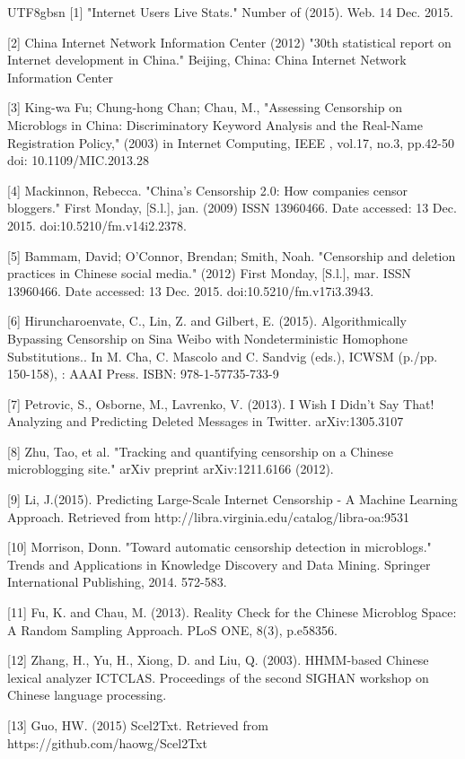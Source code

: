 \documentclass{article} %
\begin{document}
\begin{CJK*}{UTF8}{gbsn}
[1] "Internet Users Live Stats." Number of (2015). Web. 14 Dec. 2015.

[2] China Internet Network Information Center (2012) "30th statistical report on Internet development in China." Beijing, China: China Internet Network Information Center

[3] King-wa Fu; Chung-hong Chan; Chau, M., "Assessing Censorship on Microblogs in China: Discriminatory Keyword Analysis and the Real-Name Registration Policy," (2003) in Internet Computing, IEEE , vol.17, no.3, pp.42-50 doi: 10.1109/MIC.2013.28

[4] Mackinnon, Rebecca. "China’s Censorship 2.0: How companies censor bloggers." First Monday, [S.l.], jan. (2009) ISSN 13960466. Date accessed: 13 Dec. 2015. doi:10.5210/fm.v14i2.2378.

[5] Bammam, David; O'Connor, Brendan; Smith, Noah. "Censorship and deletion practices in Chinese social media." (2012) First Monday, [S.l.], mar. ISSN 13960466. Date accessed: 13 Dec. 2015. doi:10.5210/fm.v17i3.3943.

[6] Hiruncharoenvate, C., Lin, Z. and Gilbert, E. (2015). Algorithmically Bypassing Censorship on Sina Weibo with Nondeterministic Homophone Substitutions.. In M. Cha, C. Mascolo and C. Sandvig (eds.), ICWSM (p./pp. 150-158), : AAAI Press. ISBN: 978-1-57735-733-9 

[7] Petrovic, S., Osborne, M., Lavrenko, V. (2013). I Wish I Didn't Say That! Analyzing and Predicting Deleted Messages in Twitter. arXiv:1305.3107

[8] Zhu, Tao, et al. "Tracking and quantifying censorship on a Chinese microblogging site." arXiv preprint arXiv:1211.6166 (2012).

[9] Li, J.(2015). Predicting Large-Scale Internet Censorship - A Machine Learning Approach. Retrieved from http://libra.virginia.edu/catalog/libra-oa:9531

[10] Morrison, Donn. "Toward automatic censorship detection in microblogs." Trends and Applications in Knowledge Discovery and Data Mining. Springer International Publishing, 2014. 572-583.

[11] Fu, K. and Chau, M. (2013). Reality Check for the Chinese Microblog Space: A Random Sampling Approach. PLoS ONE, 8(3), p.e58356.

[12] Zhang, H., Yu, H., Xiong, D. and Liu, Q. (2003). HHMM-based Chinese lexical analyzer ICTCLAS. Proceedings of the second SIGHAN workshop on Chinese language processing.

[13] Guo, HW. (2015) Scel2Txt. Retrieved from https://github.com/haowg/Scel2Txt

\clearpage\end{CJK*}
\end{document}
